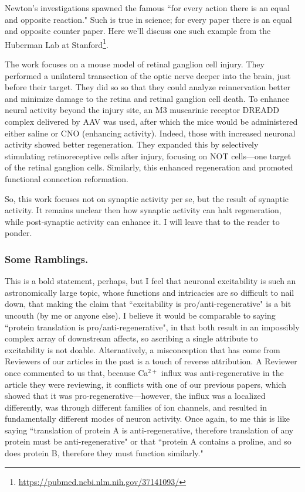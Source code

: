 Newton's investigations spawned the famous ``for every action there is an equal and opposite reaction." Such is true in science; for every paper there is an equal and opposite counter paper. Here we'll discuss one such example from the Huberman Lab at Stanford\footnote{\url{https://pubmed.ncbi.nlm.nih.gov/37141093/}}.\newline

The work focuses on a mouse model of retinal ganglion cell injury. They performed a unilateral transection of the optic nerve deeper into the brain, just before their target. They did so so that they could analyze reinnervation better and minimize damage to the retina and retinal ganglion cell death. To enhance neural activity beyond the injury site, an M3 muscarinic receptor DREADD complex delivered by AAV was used, after which the mice would be administered either saline or CNO (enhancing activity). Indeed, those with increased neuronal activity showed better regeneration. They expanded this by selectively stimulating retinoreceptive cells after injury, focusing on NOT cells---one target of the retinal ganglion cells. Similarly, this enhanced regeneration and promoted functional connection reformation. \newline

So, this work focuses not on synaptic activity per se, but the result of synaptic activity. It remains unclear then how synaptic activity can halt regeneration, while post-synaptic activity can enhance it. I will leave that to the reader to ponder.


\subsubsection{Some Ramblings.}

This is a bold statement, perhaps, but I feel that neuronal excitability is such an astronomically large topic, whose functions and intricacies are so difficult to nail down, that making the claim that ``excitability is pro/anti-regenerative" is a bit uncouth (by me or anyone else). I believe it would be comparable to saying ``protein translation is pro/anti-regenerative", in that both result in an impossibly complex array of downstream affects, so ascribing a single attribute to excitability is not doable. Alternatively, a misconception that has come from Reviewers of our articles in the past is a touch of reverse attribution. A Reviewer once commented to us that, because Ca$^{2+}$ influx was anti-regenerative in the article they were reviewing, it conflicts with one of our previous papers, which showed that it was pro-regenerative---however, the influx was a localized differently, was through different families of ion channels, and resulted in fundamentally different modes of neuron activity. Once again, to me this is like saying ``translation of protein A is anti-regenerative, therefore translation of any protein must be anti-regenerative" or that ``protein A contains a proline, and so does protein B, therefore they must function similarly."\newline

